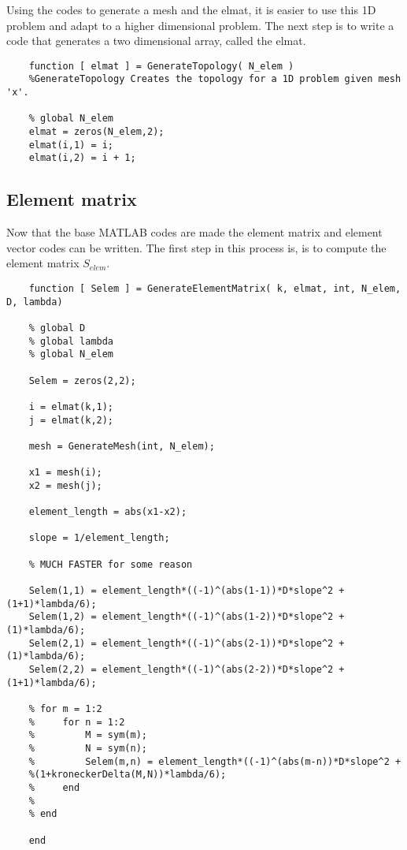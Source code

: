 \documentclass{report}
\begin{document}
Using the codes to generate a mesh and the elmat, it is easier to use this 1D problem and adapt to a higher dimensional problem. The next step is to write a code that generates a two dimensional array, called the elmat.

\begin{lstlisting}
	function [ elmat ] = GenerateTopology( N_elem )
	%GenerateTopology Creates the topology for a 1D problem given mesh 'x'.
	
	% global N_elem
	elmat = zeros(N_elem,2);
	elmat(i,1) = i;
	elmat(i,2) = i + 1;

\end{lstlisting}

\subsection{Element matrix}

Now that the base MATLAB codes are made the element matrix and element vector codes can be written. The first step in this process is, is to compute the element matrix $S_{elem}$.

\begin{lstlisting}
	function [ Selem ] = GenerateElementMatrix( k, elmat, int, N_elem, D, lambda)
	
	% global D
	% global lambda
	% global N_elem
	
	Selem = zeros(2,2);
	
	i = elmat(k,1);
	j = elmat(k,2);
	
	mesh = GenerateMesh(int, N_elem);
	
	x1 = mesh(i);
	x2 = mesh(j);
	
	element_length = abs(x1-x2);
	
	slope = 1/element_length; 
	
	% MUCH FASTER for some reason
	
	Selem(1,1) = element_length*((-1)^(abs(1-1))*D*slope^2 + (1+1)*lambda/6);
	Selem(1,2) = element_length*((-1)^(abs(1-2))*D*slope^2 + (1)*lambda/6);
	Selem(2,1) = element_length*((-1)^(abs(2-1))*D*slope^2 + (1)*lambda/6);
	Selem(2,2) = element_length*((-1)^(abs(2-2))*D*slope^2 + (1+1)*lambda/6);
	
	% for m = 1:2
	%     for n = 1:2
	%         M = sym(m);
	%         N = sym(n);
	%         Selem(m,n) = element_length*((-1)^(abs(m-n))*D*slope^2 +
	%(1+kroneckerDelta(M,N))*lambda/6);
	%     end
	%     
	% end
	
	end
\end{lstlisting}
\end{document}
